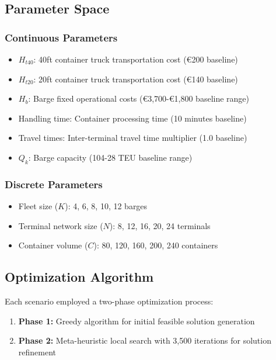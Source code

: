 \documentclass[12pt,a4paper]{article}
\begin{document}
\subsection{Parameter Space}

\subsubsection{Continuous Parameters}
\begin{itemize}
    \item $H_{t40}$: 40ft container truck transportation cost (€200 baseline)
    \item $H_{t20}$: 20ft container truck transportation cost (€140 baseline)
    \item $H_b$: Barge fixed operational costs (€3,700-€1,800 baseline range)
    \item Handling time: Container processing time (10 minutes baseline)
    \item Travel times: Inter-terminal travel time multiplier (1.0 baseline)
    \item $Q_k$: Barge capacity (104-28 TEU baseline range)
\end{itemize}

\subsubsection{Discrete Parameters}
\begin{itemize}
    \item Fleet size ($K$): 4, 6, 8, 10, 12 barges
    \item Terminal network size ($N$): 8, 12, 16, 20, 24 terminals
    \item Container volume ($C$): 80, 120, 160, 200, 240 containers
\end{itemize}

\subsection{Optimization Algorithm}

Each scenario employed a two-phase optimization process:
\begin{enumerate}
    \item \textbf{Phase 1:} Greedy algorithm for initial feasible solution generation
    \item \textbf{Phase 2:} Meta-heuristic local search with 3,500 iterations for solution refinement
\end{enumerate}
\end{document}
